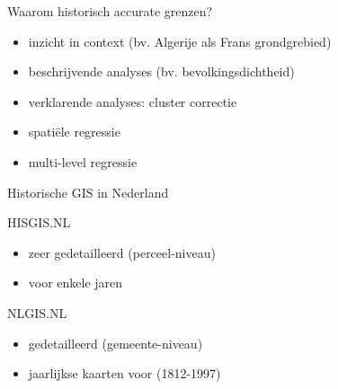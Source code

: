 \documentclass[ignorenonframetext,]{beamer}
\begin{document}
\begin{frame}{Waarom historisch accurate grenzen?}

\begin{itemize}
\itemsep1pt\parskip0pt
\item
  inzicht in context (bv. Algerije als Frans grondgrebied)
\item
  beschrijvende analyses (bv. bevolkingsdichtheid)
\item
  verklarende analyses: cluster correctie
\item
  spatiële regressie
\item
  multi-level regressie
\end{itemize}

\end{frame}

\begin{frame}{Historische GIS in Nederland}

\begin{block}{HISGIS.NL}

\begin{itemize}
\itemsep1pt\parskip0pt
\item
  zeer gedetailleerd (perceel-niveau)
\item
  voor enkele jaren
\end{itemize}

\end{block}

\begin{block}{NLGIS.NL}

\begin{itemize}
\itemsep1pt\parskip0pt
\item
  gedetailleerd (gemeente-niveau)
\item
  jaarlijkse kaarten voor (1812-1997)
\end{itemize}

\end{block}

\end{frame}
\end{document}
